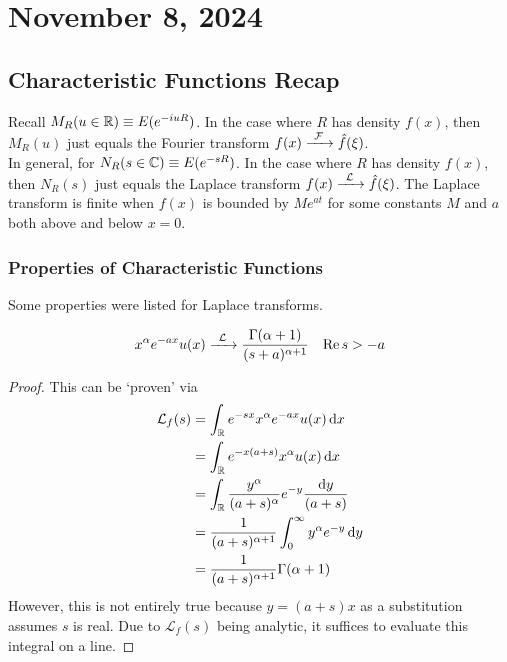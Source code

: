 \section{November 8, 2024}

\subsection{Characteristic Functions Recap}
Recall $M_R(u \in \mathbb{R}) \equiv E(e^{-iuR})$. In the case where $R$ has density $f(x)$, then $M_R(u)$ just equals the Fourier transform $f(x) \ce{->[$\mathcal{F}$]} \hat{f}(\xi)$.\\

\noindent In general, for $N_R(s \in \mathbb{C}) \equiv E(e^{-sR})$. In the case where $R$ has density $f(x)$, then $N_R(s)$ just equals the Laplace transform $f(x) \ce{->[$\mathcal{L}$]} \hat{f}(\xi)$. The Laplace transform is finite when $f(x)$ is bounded by $Me^{at}$ for some constants $M$ and $a$ both above and below $x = 0$.

\subsubsection{Properties of Characteristic Functions}
Some properties were listed for Laplace transforms.
\begin{proposition}
    \begin{align}
        x^\alpha e^{-ax} u(x) \ce{->[$\mathcal{L}$]} \frac{\Gamma(\alpha+1)}{(s+a)^{\alpha+1}} && \Re s > -a
    \end{align}
\end{proposition}
\begin{proof}
    This can be `proven' via
    \begin{align}
        \mathcal{L}_f(s)
        &= \int_{\mathbb{R}} e^{-sx} x^{\alpha} e^{-ax} u(x) \dd{x}\\
        &= \int_{\mathbb{R}} e^{-x(a+s)} x^{\alpha} u(x) \dd{x}\\
        &= \int_{\mathbb{R}} \frac{y^\alpha}{(a+s)^\alpha}e^{-y} \frac{\dd{y}}{(a+s)}\\
        &= \frac{1}{(a+s)^{\alpha+1}} \int_0^\infty y^\alpha e^{-y} \dd{y}\\
        &= \frac{1}{(a+s)^{\alpha+1}} \Gamma(\alpha+1)
    \end{align}
    However, this is not entirely true because $y = (a+s)x$ as a substitution assumes $s$ is real. Due to $\mathcal{L}_f(s)$ being analytic, it suffices to evaluate this integral on a line.
\end{proof}

